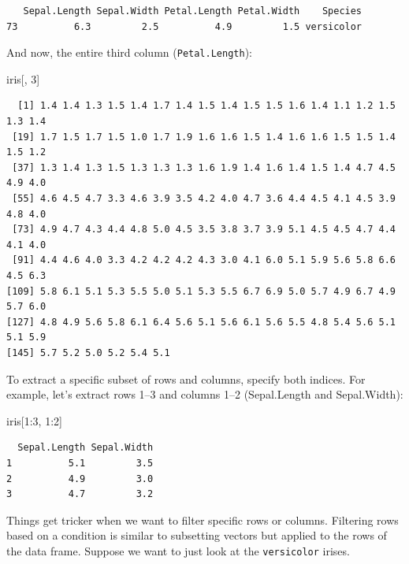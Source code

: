 \documentclass[
  letterpaper,
]{book}
\newenvironment{Shaded}{\begin{snugshade}}{\end{snugshade}}
\newcommand{\DecValTok}[1]{\textcolor[rgb]{0.68,0.00,0.00}{#1}}
\newcommand{\NormalTok}[1]{\textcolor[rgb]{0.00,0.23,0.31}{#1}}
\newcommand{\SpecialCharTok}[1]{\textcolor[rgb]{0.37,0.37,0.37}{#1}}
\begin{document}
\begin{verbatim}
   Sepal.Length Sepal.Width Petal.Length Petal.Width    Species
73          6.3         2.5          4.9         1.5 versicolor
\end{verbatim}

And now, the entire third column (\texttt{Petal.Length}):

\begin{Shaded}
\begin{Highlighting}[]
\NormalTok{iris[, }\DecValTok{3}\NormalTok{]}
\end{Highlighting}
\end{Shaded}

\begin{verbatim}
  [1] 1.4 1.4 1.3 1.5 1.4 1.7 1.4 1.5 1.4 1.5 1.5 1.6 1.4 1.1 1.2 1.5 1.3 1.4
 [19] 1.7 1.5 1.7 1.5 1.0 1.7 1.9 1.6 1.6 1.5 1.4 1.6 1.6 1.5 1.5 1.4 1.5 1.2
 [37] 1.3 1.4 1.3 1.5 1.3 1.3 1.3 1.6 1.9 1.4 1.6 1.4 1.5 1.4 4.7 4.5 4.9 4.0
 [55] 4.6 4.5 4.7 3.3 4.6 3.9 3.5 4.2 4.0 4.7 3.6 4.4 4.5 4.1 4.5 3.9 4.8 4.0
 [73] 4.9 4.7 4.3 4.4 4.8 5.0 4.5 3.5 3.8 3.7 3.9 5.1 4.5 4.5 4.7 4.4 4.1 4.0
 [91] 4.4 4.6 4.0 3.3 4.2 4.2 4.2 4.3 3.0 4.1 6.0 5.1 5.9 5.6 5.8 6.6 4.5 6.3
[109] 5.8 6.1 5.1 5.3 5.5 5.0 5.1 5.3 5.5 6.7 6.9 5.0 5.7 4.9 6.7 4.9 5.7 6.0
[127] 4.8 4.9 5.6 5.8 6.1 6.4 5.6 5.1 5.6 6.1 5.6 5.5 4.8 5.4 5.6 5.1 5.1 5.9
[145] 5.7 5.2 5.0 5.2 5.4 5.1
\end{verbatim}

To extract a specific subset of rows and columns, specify both indices.
For example, let's extract rows 1--3 and columns 1--2 (Sepal.Length and
Sepal.Width):

\begin{Shaded}
\begin{Highlighting}[]
\NormalTok{iris[}\DecValTok{1}\SpecialCharTok{:}\DecValTok{3}\NormalTok{, }\DecValTok{1}\SpecialCharTok{:}\DecValTok{2}\NormalTok{]}
\end{Highlighting}
\end{Shaded}

\begin{verbatim}
  Sepal.Length Sepal.Width
1          5.1         3.5
2          4.9         3.0
3          4.7         3.2
\end{verbatim}

Things get tricker when we want to filter specific rows or columns.
Filtering rows based on a condition is similar to subsetting vectors but
applied to the rows of the data frame. Suppose we want to just look at
the \texttt{versicolor} irises.
\end{document}
